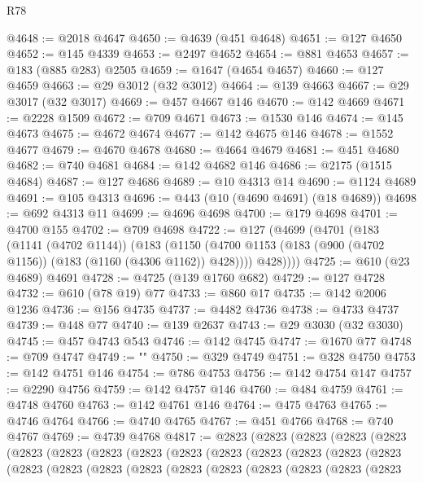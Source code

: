 \begin{lexlean}{R78}
\begin{coremodule}
@4648 := @2018 @4647
@4650 := @4639 (@451 @4648)
@4651 := @127 @4650
@4652 := @145 @4339
@4653 := @2497 @4652
@4654 := @881 @4653
@4657 := @183 (@885 @283) @2505
@4659 := @1647 (@4654 @4657)
@4660 := @127 @4659
@4663 := @29 @3012 (@32 @3012)
@4664 := @139 @4663
@4667 := @29 @3017 (@32 @3017)
@4669 := @457 @4667 @146
@4670 := @142 @4669
@4671 := @2228 @1509
@4672 := @709 @4671
@4673 := @1530 @146
@4674 := @145 @4673
@4675 := @4672 @4674
@4677 := @142 @4675 @146
@4678 := @1552 @4677
@4679 := @4670 @4678
@4680 := @4664 @4679
@4681 := @451 @4680
@4682 := @740 @4681
@4684 := @142 @4682 @146
@4686 := @2175 (@1515 @4684)
@4687 := @127 @4686
@4689 := @10 @4313 @14
@4690 := @1124 @4689
@4691 := @105 @4313
@4696 := @443 (@10 (@4690 @4691) (@18 @4689))
@4698 := @692 @4313 @11
@4699 := @4696 @4698
@4700 := @179 @4698
@4701 := @4700 @155
@4702 := @709 @4698
@4722 := @127
    (@4699
      (@4701
        (@183
          (@1141 (@4702 @1144))
          (@183
            (@1150 (@4700 @1153 (@183 (@900 (@4702 @1156)) (@183 (@1160 (@4306 @1162)) @428))))
            @428))))
@4725 := @610 (@23 @4689) @4691
@4728 := @4725 (@139 @1760 @682)
@4729 := @127 @4728
@4732 := @610 (@78 @19) @77
@4733 := @860 @17
@4735 := @142 @2006 @1236
@4736 := @156 @4735
@4737 := @4482 @4736
@4738 := @4733 @4737
@4739 := @448 @77
@4740 := @139 @2637
@4743 := @29 @3030 (@32 @3030)
@4745 := @457 @4743 @543
@4746 := @142 @4745
@4747 := @1670 @77
@4748 := @709 @4747
@4749 := "\n"
@4750 := @329 @4749
@4751 := @328 @4750
@4753 := @142 @4751 @146
@4754 := @786 @4753
@4756 := @142 @4754 @147
@4757 := @2290 @4756
@4759 := @142 @4757 @146
@4760 := @484 @4759
@4761 := @4748 @4760
@4763 := @142 @4761 @146
@4764 := @475 @4763
@4765 := @4746 @4764
@4766 := @4740 @4765
@4767 := @451 @4766
@4768 := @740 @4767
@4769 := @4739 @4768
@4817 := @2823
    (@2823
      (@2823
        (@2823
          (@2823
            (@2823
              (@2823
                (@2823
                  (@2823
                    (@2823
                      (@2823
                        (@2823
                          (@2823
                            (@2823
                              (@2823
                                (@2823
                                  (@2823
                                    (@2823
                                      (@2823
                                        (@2823
                                          (@2823
                                            (@2823
                                              (@2823
                                                (@2823
                                                  (@2823

\end{coremodule}
\end{lexlean}

